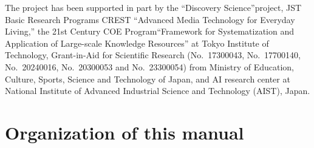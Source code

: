 \documentclass[a4paper]{report}
\begin{document}
The project has been supported in part by
the ``Discovery Science''project,
JST Basic Research Programs CREST ``Advanced Media Technology for Everyday Living,''
the 21st Century COE Program``Framework for Systematization and Application of Large-scale
Knowledge Resources'' at Tokyo  Institute of Technology,
Grant-in-Aid for Scientific Research (No.~17300043, No.~17700140, No.~20240016,
No.~20300053 and No.~23300054) from Ministry of Education, Culture, Sports,
Science and Technology of Japan,
and
AI research center at
National Institute of Advanced Industrial Science and Technology (AIST), Japan.


\section*{Organization of this manual}
\label{sec:overview:organization}
\end{document}
